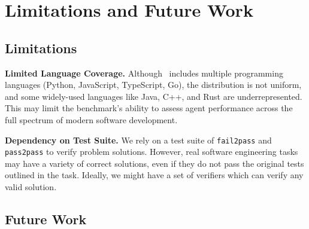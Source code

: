 \section{Limitations and Future Work}


\subsection{Limitations}

\textbf{Limited Language Coverage.} Although \benchmarkname~includes multiple programming languages (Python, JavaScript, TypeScript, Go), the distribution is not uniform, and some widely-used languages like Java, C++, and Rust are underrepresented. This may limit the benchmark's ability to assess agent performance across the full spectrum of modern software development.


\textbf{Dependency on Test Suite.} We rely on a test suite of \texttt{fail2pass} and \texttt{pass2pass} to verify problem solutions. However, real software engineering tasks may have a variety of correct solutions, even if they do not pass the original tests outlined in the task. Ideally, we might have a set of verifiers which can verify any valid solution. 


\subsection{Future Work}


